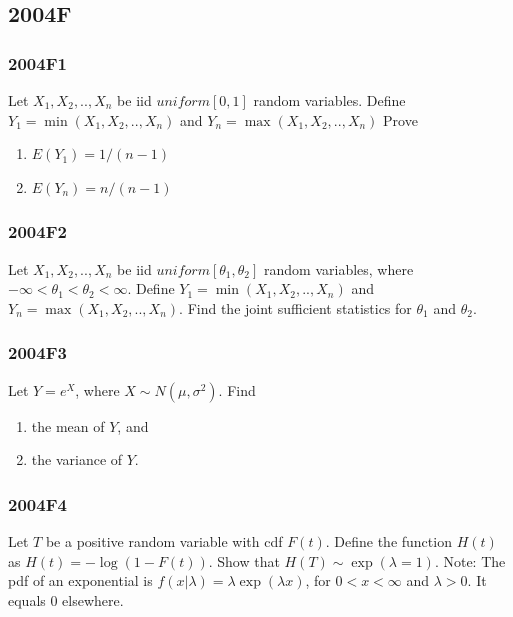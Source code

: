 \documentclass[6pt,twocolumn,Portrait]{article}
\begin{document}
\hypertarget{f-2}{%
\subsection{2004F}\label{f-2}}

\hypertarget{f1-2}{%
\subsubsection{2004F1}\label{f1-2}}

Let \(X_1,X_2,..,X_n\) be iid \(uniform[0,1]\) random variables. Define
\(Y_1=\min(X_1,X_2,..,X_n)\) and \(Y_n=\max(X_1,X_2,..,X_n)\) Prove

\begin{enumerate}
\def\labelenumi{(\alph{enumi})}
\item
  \(E(Y_1) =1/(n-1)\)
\item
  \(E(Y_n) =n/(n-1)\)
\end{enumerate}

\hypertarget{f2-2}{%
\subsubsection{2004F2}\label{f2-2}}

Let \(X_1,X_2,..,X_n\) be iid \(uniform[\theta_1,\theta_2]\) random
variables, where \(-\infty<\theta_1<\theta_2<\infty\). Define
\(Y_1=\min(X_1,X_2,..,X_n)\) and \(Y_n=\max(X_1,X_2,..,X_n)\). Find the
joint sufficient statistics for \(\theta_1\) and \(\theta_2\).

\hypertarget{f3-2}{%
\subsubsection{2004F3}\label{f3-2}}

Let \(Y=e^X\), where \(X\sim N(\mu,\sigma^2)\). Find

\begin{enumerate}
\def\labelenumi{(\alph{enumi})}
\item
  the mean of \(Y\), and
\item
  the variance of \(Y\).
\end{enumerate}

\hypertarget{f4-2}{%
\subsubsection{2004F4}\label{f4-2}}

Let \(T\) be a positive random variable with cdf \(F(t)\). Define the
function \(H(t)\) as \(H(t)=-\log(1-F(t))\). Show that
\(H (T)\sim\exp(\lambda=1)\). Note: The pdf of an exponential is
\(f(x|\lambda)=\lambda\exp(\lambda x)\), for \(0<x<\infty\) and
\(\lambda>0\). It equals 0 elsewhere.
\end{document}
